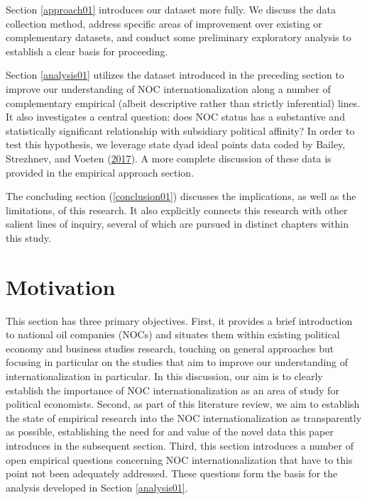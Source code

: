 \documentclass[11pt,]{book}
\begin{document}
Section \ref{approach01} introduces our dataset more fully. We discuss the data collection method, address specific areas of improvement over existing or complementary datasets, and conduct some preliminary exploratory analysis to establish a clear basis for proceeding.

Section \ref{analysis01} utilizes the dataset introduced in the preceding section to improve our understanding of NOC internationalization along a number of complementary empirical (albeit descriptive rather than strictly inferential) lines. It also investigates a central question: does NOC status has a substantive and statistically significant relationship with subsidiary political affinity? In order to test this hypothesis, we leverage state dyad ideal points data coded by Bailey, Strezhnev, and Voeten (\protect\hyperlink{ref-bailey_estimating_2017}{2017}). A more complete discussion of these data is provided in the empirical approach section.

The concluding section (\ref{conclusion01}) discusses the implications, as well as the limitations, of this research. It also explicitly connects this research with other salient lines of inquiry, several of which are pursued in distinct chapters within this study.

\hypertarget{motiv01}{%
\section{Motivation}\label{motiv01}}

This section has three primary objectives. First, it provides a brief introduction to national oil companies (NOCs) and situates them within existing political economy and business studies research, touching on general approaches but focusing in particular on the studies that aim to improve our understanding of internationalization in particular. In this discussion, our aim is to clearly establish the importance of NOC internationalization as an area of study for political economists. Second, as part of this literature review, we aim to establish the state of empirical research into the NOC internationalization as transparently as possible, establishing the need for and value of the novel data this paper introduces in the subsequent section. Third, this section introduces a number of open empirical questions concerning NOC internationalization that have to this point not been adequately addressed. These questions form the basis for the analysis developed in Section \ref{analysis01}.
\end{document}
